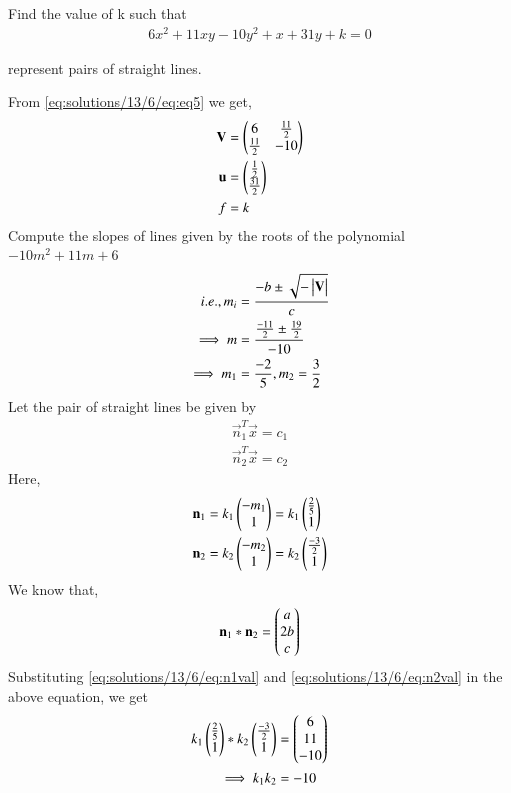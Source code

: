 Find the value of k such that 
\begin{align}
	6x^2 + 11xy - 10y^2 + x + 31y + k =0 \label{eq:solutions/13/6/eq:eq5}
\end{align}

represent pairs of straight lines.

From \eqref{eq:solutions/13/6/eq:eq5} we get,
\begin{align}
	\mathbf{V} &= \begin{pmatrix}6 & \frac{11}{2} \\ \frac{11}{2} & -10\end{pmatrix}\\
	\mathbf{u} &= \begin{pmatrix}\frac{1}{2}\\ \frac{31}{2}\end{pmatrix}\\
	f &= k
\end{align}
Compute the slopes of lines given by the roots of the polynomial $-10m^2 + 11m + 6$
\begin{align}
   i.e., m_i &= \frac{-b \pm \sqrt{- \begin{vmatrix}\mathbf{V}\end{vmatrix}}}{c} \label{eq:solutions/13/6/eq:eq2} \\
   \implies m &= \frac{\frac{-11}{2} \pm \frac{19}{2}}{-10} \\ 
   \implies m_1 &= \frac{-2}{5}, m_2 = \frac{3}{2} 
\end{align} 
Let the pair of straight lines be given by 
\begin{align}
	\vec{n}_1^T\vec{x} = c_1 \label{eq:solutions/13/6/eq:n_1}\\
	\vec{n}_2^T\vec{x} = c_2 \label{eq:solutions/13/6/eq:n_2}
\end{align}
Here,
\begin{align}
	\mathbf{n}_1 &= k_1\begin{pmatrix}-m_1\\1\end{pmatrix} = k_1 \begin{pmatrix} \frac{2}{5} \\ 1\end{pmatrix}  \label{eq:solutions/13/6/eq:n1val}\\
	\mathbf{n}_2 &= k_2\begin{pmatrix}-m_2\\1\end{pmatrix} = k_2 \begin{pmatrix}\frac{-3}{2} \\ 1\end{pmatrix} \label{eq:solutions/13/6/eq:n2val}
\end{align}
We know that, 
\begin{align}
	\mathbf{n}_1 * \mathbf{n}_2 = \begin{pmatrix}a\\2b\\c\end{pmatrix} \label{eq:solutions/13/6/eq:n1n2}
\end{align}
Substituting \eqref{eq:solutions/13/6/eq:n1val} and \eqref{eq:solutions/13/6/eq:n2val} in the above equation, we get
\begin{align}
	k_1 \begin{pmatrix} \frac{2}{5} \\ 1\end{pmatrix} * k_2 \begin{pmatrix}\frac{-3}{2} \\ 1\end{pmatrix} &= \begin{pmatrix}6\\ 11\\ -10\end{pmatrix}\\
	\implies k_1k_2 &= -10
\end{align} 
